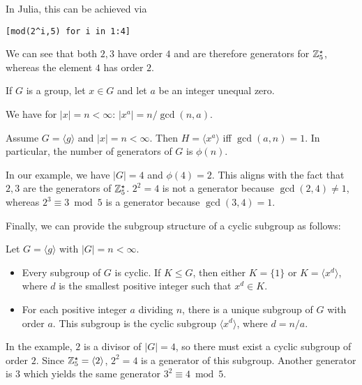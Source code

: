 In Julia, this can be achieved via

\begin{verbatim}
[mod(2^i,5) for i in 1:4]
\end{verbatim}

We can see that both $2, 3$ have order $4$ and are therefore generators for $\mathbb{Z}_5^\star$, whereas the element $4$ has order $2$.

\begin{theorem}
	If $G$ is a group, let $x \in G$ and let $a$ be an integer unequal zero.
	
	We have for $|x| = n < \infty$: $|x^a| = n / \gcd(n,a)$.
	
	Assume $G = \langle g \rangle$ and $|x| = n < \infty$. Then $H = \langle x^a \rangle$ iff $\gcd(a,n) = 1$. In particular, the number of generators of $G$ is $\phi(n)$.
	
\end{theorem}

In our example, we have $|G| = 4$ and $\phi(4) = 2$. This aligns with the fact that $2,3$ are the generators of $\mathbb{Z}_5^\star$. $2^2 = 4$ is not a generator because $\gcd(2,4) \neq 1$, whereas $2^3 \equiv 3 \bmod 5$ is a generator because $\gcd(3,4) = 1$.

Finally, we can provide the subgroup structure of a cyclic subgroup as follows:

\begin{theorem}
	Let $G = \langle g \rangle$ with $|G| = n < \infty$.
	\begin{itemize}
		\item Every subgroup of $G$ is cyclic. If $K \leq G$, then either $K = \{1\}$ or $K = \langle x^d \rangle$, where $d$ is the smallest positive integer such that $x^d \in K$.
		\item For each positive integer $a$ dividing $n$, there is a unique subgroup of $G$ with order $a$. This subgroup is the cyclic subgroup $\langle x^d \rangle$, where $d = n / a$.
	\end{itemize}
\end{theorem}

In the example, $2$ is a divisor of $|G| = 4$, so there must exist a cyclic subgroup of order $2$. Since $\mathbb{Z}_5^\star = \langle 2 \rangle$, $2^2 = 4$ is a generator of this subgroup. Another generator is $3$ which yields the same generator $3^2 \equiv 4 \bmod 5$.
